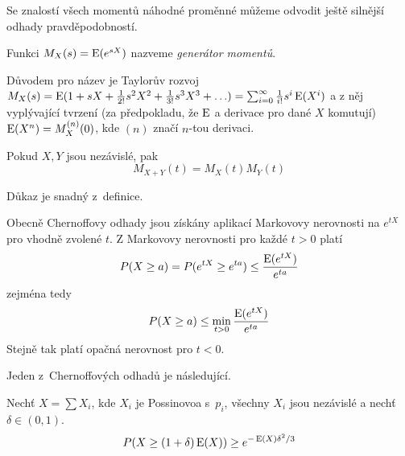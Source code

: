 
Se znalostí všech momentů náhodné proměnné můžeme odvodit ještě silnější
odhady pravděpodobností.

\begin{definition}
    Funkci $M_X(s) = \operatorname{E}(e^{s X})$ nazveme {\em generátor momentů}.
\end{definition}

Důvodem pro název je Taylorův rozvoj
$M_X(s)
= \operatorname{E}( 1 + sX + \frac{1}{2!}s^2 X^2 + \frac{1}{3!}s^3 X^3 + \ldots )
= \sum_{i = 0}^{\infty} \frac{1}{i!} s^i \operatorname{E} (X^i)$
a z něj vyplývající tvrzení (za předpokladu, že $\operatorname{E}$ a derivace
pro dané $X$ komutují) $\operatorname{E}(X^n) = M^{(n)}_X(0)$, kde $(n)$ značí $n$-tou
derivaci.

\begin{theorem}
    Pokud $X, Y$ jsou nezávislé, pak
    \[
        M_{X+Y}(t) = M_X(t) M_Y(t)
    \]
\end{theorem}

Důkaz je snadný z~definice.

Obecně Chernoffovy odhady jsou získány aplikací Markovovy nerovnosti na
$e^{tX}$ pro vhodně zvolené $t$. Z Markovovy nerovnosti pro každé $t >
0$ platí
\[
    P(X \geq a) = P(e^{tX} \geq e^{ta}) \leq \frac{\operatorname{E}(e^{tX})}{e^{ta}}
\]
zejména tedy
\[
    P(X \geq a) \leq \min_{t > 0} \frac{\operatorname{E}(e^{tX})}{e^{ta}}
\]
Stejně tak platí opačná nerovnost pro $t < 0$.


Jeden z~Chernoffových odhadů je následující.

\begin{theorem}
    Nechť $X = \sum X_i$, kde $X_i$ je Possinovoa s~$p_i$,
    všechny $X_i$ jsou nezávislé a nechť $\delta \in (0,1)$.
    \[
        P(X \geq (1 + \delta) \operatorname{E}(X)) \geq e^{- \operatorname{E}(X) \delta^2 / 3}
    \]
\end{theorem}

